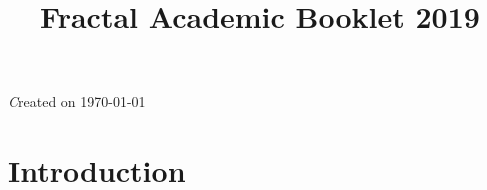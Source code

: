 \documentclass[10pt, a4paper]{book}
\title{Fractal Academic Booklet 2019}
\author{}
\date{}
\newcommand{\chaptertitle}[1]{
    \stepcounter{chapter}
    \chapter*{\thechapter\hspace{3mm}#1}\addcontentsline{toc}{chapter}{\thechapter\hspace{3mm}#1}
}
\begin{document}


\begingroup
\let\cleardoublepage\clearpage
\tableofcontents
\endgroup
\vspace {3mm}
{\emph Created on \today\par}
\chapter{Introduction}


\newpage
\end{document}
